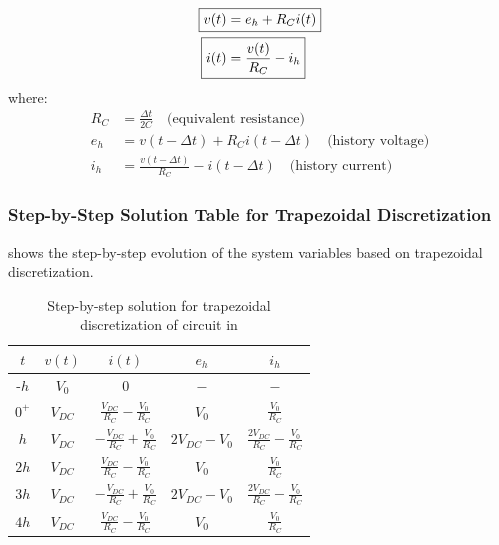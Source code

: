 \begin{tcolorbox}[colback=burntOrange!5, colframe=burntOrange!80!black, title={\color{white}\textbf{Trapezoidal: Capacitor Companion Model}}]
\begin{align}
    \Aboxed{v(t) &= e_h + R_C i(t)} \label{eq:vt_cap_trapz} \\
    \Aboxed{i(t) &= \frac{v(t)}{R_C} - i_h} \label{eq:it_cap_trapz}
\end{align}
where:
\begin{align}
    R_C &= \frac{\Delta t}{2C} \quad \text{(equivalent resistance)} \\
    e_h &= v(t - \Delta t) + R_C i(t - \Delta t) \quad \text{(history voltage)} \\
    i_h &= \frac{v(t - \Delta t)}{R_C} - i(t - \Delta t) \quad \text{(history current)}
\end{align}
\end{tcolorbox}

\vspace{1em}

\subsubsection*{Step-by-Step Solution Table for Trapezoidal Discretization}
 shows the step-by-step evolution of the system variables based on trapezoidal discretization.

\begin{table}[h!]
\centering
\renewcommand{\arraystretch}{2.5}
\setlength{\tabcolsep}{12pt}
\begin{tabular}{|c|c|c|c|c|}
\hline
\rowcolor{burntOrange}
	\textbf{\color{white}$t$} & \textbf{\color{white}$v(t)$} & \textbf{\color{white}$i(t)$} & \textbf{\color{white}$e_h$} & \textbf{\color{white}$i_h$} \\[1ex]
\hline
\rowcolor{lightBurntOrange}
 $\text{-}h$ & $V_0$ & $0$ & $-$ & $-$ \\[1ex]
\hline
 $0^+$ & $V_{DC}$ & $\displaystyle\frac{V_{DC}}{R_C} - \frac{V_0}{R_C}$ & $V_0$ & $\displaystyle\frac{V_0}{R_C}$ \\[1ex]
\hline
\rowcolor{lightBurntOrange}
 $h$ & $V_{DC}$ & $\displaystyle{-}\frac{V_{DC}}{R_C} + \frac{V_0}{R_C}$ & $2V_{DC} - V_0$ & $\displaystyle\frac{2V_{DC}}{R_C} - \frac{V_0}{R_C}$ \\[1ex]
\hline
 $2h$ & $V_{DC}$ & $\displaystyle\frac{V_{DC}}{R_C} - \frac{V_0}{R_C}$ & $V_0$ & $\displaystyle\frac{V_0}{R_C}$ \\[1ex]
\hline
\rowcolor{lightBurntOrange}
 $3h$ & $V_{DC}$ & $\displaystyle{-}\frac{V_{DC}}{R_C} + \frac{V_0}{R_C}$ & $2V_{DC} - V_0$ & $\displaystyle\frac{2V_{DC}}{R_C} - \frac{V_0}{R_C}$ \\[1ex]
\hline
 $4h$ & $V_{DC}$ & $\displaystyle\frac{V_{DC}}{R_C} - \frac{V_0}{R_C}$ & $V_0$ & $\displaystyle\frac{V_0}{R_C}$ \\[1ex]
\hline
\end{tabular}
\caption{Step-by-step solution for trapezoidal discretization of circuit in }
\label{tab:trapz_solution_ckt_a}
\end{table}

